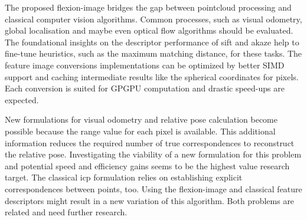 The proposed \gls{flexion-image} bridges the gap between pointcloud processing and classical computer vision algorithms.
Common processes, such as visual odometry, global localisation and maybe even optical flow algorithms should be evaluated.
The foundational insights on the descriptor performance of \acrshort{sift} and \acrshort{akaze} help to fine-tune heuristics, such as the maximum matching distance, for these tasks.
The feature image conversions implementations can be optimized by better \acrshort{SIMD} support and caching intermediate results like the spherical coordinates for pixels.
Each conversion is suited for \acrshort{GPGPU} computation and drastic speed-ups are expected.

New formulations for visual odometry and relative pose calculation become possible because the range value for each pixel is available.
This additional information reduces the required number of true correspondences to reconstruct the relative pose.
Investigating the viability of a new formulation for this problem and potential speed and efficiency gains seems to be the highest value research target.
The classical \acrshort{icp} formulation relies on establishing explicit correspondences between points, too.
Using the \gls{flexion-image} and classical feature descriptors might result in a new variation of this algorithm.
Both problems are related and need further research.
